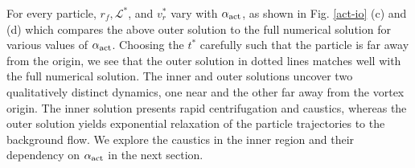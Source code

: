 \documentclass[../Rajarshi-thesis-draft.tex]{subfiles}
\begin{document}
For every particle, $r_f, \mathscr{L}^*$, and $v_r^*$ vary with $\alpha_{\rm act}$, as shown in Fig. \ref{act-io} (c) and (d) which compares the above outer solution to the full numerical solution for various values of $\alpha_{\rm act}$. Choosing the $t^*$ carefully such that the particle is far away from the origin, we see that the outer solution in dotted lines matches well with the full numerical solution. The inner and outer solutions uncover two qualitatively distinct dynamics, one near and the other far away from the vortex origin. The inner solution presents rapid centrifugation and caustics, whereas the outer solution yields exponential relaxation of the particle trajectories to the background flow. We explore the caustics in the inner region and their dependency on $\alpha_{\rm act}$ in the next section.
\end{document}
